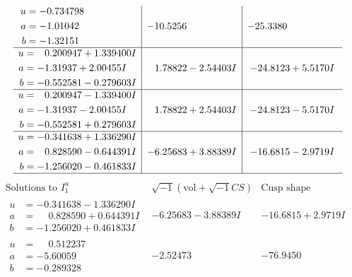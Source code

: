 \documentclass[1p]{elsarticle_modified}
\theoremstyle{definition}
\newcommand{\I}{\sqrt{-1}}
\begin{document}
$$\begin{array}{c|c|c}
\begin{aligned}
u &= -0.734798\phantom{ +0.000000I} \\
a &= -1.01042\phantom{ +0.000000I} \\
b &= -1.32151\phantom{ +0.000000I}\end{aligned}
 & -10.5256\phantom{ +0.000000I} & -25.3380\phantom{ +0.000000I} \\ \hline\begin{aligned}
u &= \phantom{-}0.200947 + 1.339400 I \\
a &= -1.31937 + 2.00455 I \\
b &= -0.552581 - 0.279603 I\end{aligned}
 & \phantom{-}1.78822 - 2.54403 I & -24.8123 + 5.5170 I \\ \hline\begin{aligned}
u &= \phantom{-}0.200947 - 1.339400 I \\
a &= -1.31937 - 2.00455 I \\
b &= -0.552581 + 0.279603 I\end{aligned}
 & \phantom{-}1.78822 + 2.54403 I & -24.8123 - 5.5170 I \\ \hline\begin{aligned}
u &= -0.341638 + 1.336290 I \\
a &= \phantom{-}0.828590 - 0.644391 I \\
b &= -1.256020 - 0.461833 I\end{aligned}
 & -6.25683 + 3.88389 I & -16.6815 - 2.9719 I\\
 \hline 
 \end{array}$$\newpage$$\begin{array}{c|c|c}  
\text{Solutions to }I^u_{1}& \I (\text{vol} + \sqrt{-1}CS) & \text{Cusp shape}\\
 \hline 
\begin{aligned}
u &= -0.341638 - 1.336290 I \\
a &= \phantom{-}0.828590 + 0.644391 I \\
b &= -1.256020 + 0.461833 I\end{aligned}
 & -6.25683 - 3.88389 I & -16.6815 + 2.9719 I \\ \hline\begin{aligned}
u &= \phantom{-}0.512237\phantom{ +0.000000I} \\
a &= -5.60059\phantom{ +0.000000I} \\
b &= -0.289328\phantom{ +0.000000I}\end{aligned}
 & -2.52473\phantom{ +0.000000I} & -76.9450\phantom{ +0.000000I} \\ \hline\begin{aligned}

\end{aligned}
\end{array}$$
\end{document}
